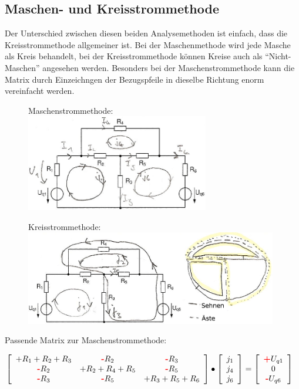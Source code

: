 \subsection{Maschen- und Kreisstrommethode}
Der Unterschied zwischen diesen beiden Analysemethoden ist einfach, dass die Kreisstrommethode allgemeiner ist. Bei der Maschenmethode wird jede Masche als Kreis behandelt, bei der Kreisstrommethode können Kreise auch als "`Nicht-Maschen"' angesehen werden. Besonders bei der Maschenstrommethode kann die Matrix durch Einzeichngen der Bezugspfeile in dieselbe Richtung enorm vereinfacht werden.
\begin{figure}[ht]
  \begin{minipage}[t]{8 cm} %
	  \centering
	  Maschenstrommethode:\\
	  \includegraphics[width=8cm]{pics/dcnet/maschenmethode}
	 \end{minipage}
	 \begin{minipage}[t]{11 cm}
	  \centering
	  Kreisstrommethode:\\
	  \includegraphics[width=11cm]{pics/dcnet/kreisstrommethode} 
  \end{minipage}
\end{figure}

Passende Matrix zur Maschenstrommethode:

$\left[\begin{array}{ccc}
	+R_1+R_2+R_3 &\text{\textbf{\textcolor{red}{-}}}R_2 &\text{\textbf{\textcolor{red}{-}}}R_3  \\
	\text{\textbf{\textcolor{red}{-}}}R_2 &+R_2+R_4+R_5
	&\text{\textbf{\textcolor{red}{-}}}R_5\\ 
	\text{\textbf{\textcolor{red}{-}}}R_3 &\text{\textbf{\textcolor{red}{-}}}R_5 &+R_3+R_5+R_6
	\end{array}\right] \bullet 
	\left[\begin{array}{l}j_1\\j_4\\j_6\end{array}\right] = 
	\left[\begin{array}{c}\text{\textbf{\textcolor{red}{+}}}U_{q1}\\0\\
	\text{\textbf{\textcolor{red}{-}}}U_{q6}
\end{array}\right]$\\

